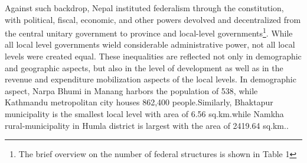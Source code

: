 Against such backdrop, Nepal instituted federalism through the constitution, with political, fiscal, economic, and other powers devolved and decentralized from the central unitary government to province and local-level governments\footnote{The brief overview on the number of federal structures is shown in Table 1}. While all local level governments wield considerable administrative power, not all local levels were created equal. These inequalities are reflected not only in demographic and geographic aspects, but also in the level of development as well as in the revenue and expenditure mobilization aspects of the local levels. In demographic aspect, Narpa Bhumi in Manang harbors the population of 538, while Kathmandu metropolitan city houses 862,400 people.\hspace{1mm}Similarly, Bhaktapur municipality is the smallest local level with area of 6.56 sq.km.\hspace{1mm}while Namkha rural-municipality in Humla district is largest with the area of 2419.64 sq.km.. \\

